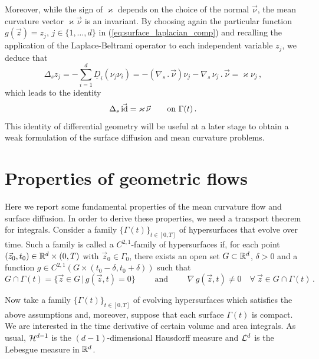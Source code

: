Moreover, while the sign of $\varkappa$ depends on the choice of the normal
$\vec\nu$, the mean curvature vector $\varkappa \vec\nu$ is an invariant. By
choosing again the particular function $g(\vec z) = z_j$, $j \in \{ 1,
\hdots, d \}$ in (\ref{eq:surface_laplacian_comp}) and recalling the application
of the Laplace-Beltrami operator to each independent variable $z_j$, we deduce
that
\begin{equation}
\Delta_s z_j = - \sum_{i = 1}^{d} \underline{D}_i (\nu_j \nu_i) =
- (\nabla_s \,.\, \vec\nu) \nu_j - \nabla_s \, \nu_j \,.\, \vec\nu = \varkappa
\nu_j\, ,
\end{equation}
which leads to the identity
\begin{equation} \label{eq:LBop}
\Delta_s\, \vec {\rm id} = \varkappa\, \vec\nu \qquad \mbox{on $\Gamma(t)$}\,.
\end{equation}
This identity of differential geometry will be useful at a later stage to
obtain a weak formulation of the surface diffusion and mean curvature problems.

\section[Properties of geometric flows]{Properties of geometric flows}
Here we report some fundamental properties of the mean curvature flow and
surface diffusion. In order to derive these properties, we need a transport
theorem for integrals. Consider a family $\{ \Gamma(t) \}_{t \in [0, T]}$
of hypersurfaces that evolve over time. Such a family is called a
$C^{2,1}$-family of hypersurfaces if, for each point $(\vec z_0, t_0) \in
{\mathbb R}^{d} \times (0, T)$ with $\vec z_0 \in \Gamma_0$, there exists an
open set $G \subset {\mathbb R}^{d}$, $\delta > 0$ and a function
$g \in C^{2,1}(G \times (t_0 - \delta, t_0 + \delta))$ such that
\begin{equation}
G \cap \Gamma (t) = \{ \vec{z} \in G \, | \, g (\vec z, t) = 0 \}
\qquad \mbox{ and } \qquad \nabla \, g (\vec z, t) \neq 0
\quad \forall\ \vec z \in G \cap \Gamma(t) \, .
\end{equation}

Now take a family $\{ \Gamma(t) \}_{t \in [0, T]}$ of evolving hypersurfaces
which satisfies the above assumptions and, moreover, suppose that each surface
$\Gamma(t)$ is compact. We are interested in the time derivative of certain
volume and area integrals. As usual, $\mathcal{H}^{d-1}$ is the $(d-1)$-dimensional
Hausdorff measure and $\mathcal{L}^d$ is the Lebesgue measure in ${\mathbb R}^d$.

